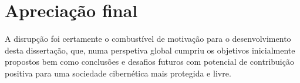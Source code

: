 \section{Apreciação final}
A disrupção foi certamente o combustível de motivação para o desenvolvimento desta dissertação, que, numa perspetiva global cumpriu os objetivos inicialmente propostos bem como conclusões e desafios futuros com potencial de contribuição positiva para uma sociedade cibernética mais protegida e livre.